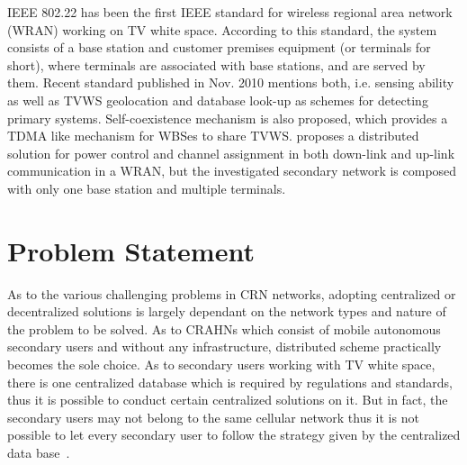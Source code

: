 IEEE 802.22 has been the first IEEE standard for wireless regional area network (WRAN) working on TV white space. According to this standard, the system consists of a base station and customer premises equipment (or terminals for short), where terminals are associated with base stations, and are served by them. Recent standard published in Nov. 2010 mentions both, i.e. sensing ability as well as TVWS geolocation and database look-up as schemes for detecting primary systems. Self-coexistence mechanism is also proposed, which provides a TDMA like mechanism for WBSes to share TVWS. \cite{HoangPowerChannel2010} proposes a distributed solution for power control and channel assignment in both down-link and up-link communication in a WRAN, but the investigated secondary network is composed with only one base station and multiple terminals. %




\section{Problem Statement}
As to the various challenging problems in CRN networks, adopting centralized or decentralized solutions is largely dependant on the network types and nature of the problem to be solved.
As to CRAHNs which consist of mobile autonomous secondary users and without any infrastructure, distributed scheme practically becomes the sole choice.
As to secondary users working with TV white space, there is one centralized database which is required by regulations and standards, thus it is possible to conduct certain centralized solutions on it.
But in fact, the secondary users may not belong to the same cellular network thus it is not possible to let every secondary user to follow the strategy given by the centralized data base~\cite{crn_futurecellular_2014}.

